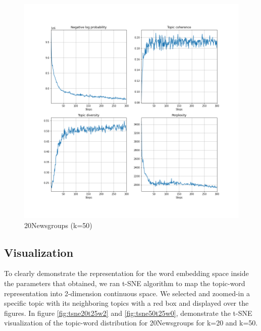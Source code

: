 \begin{figure}
\centering
\includegraphics[width=1\linewidth]{figures/0106/ppl_50t}
\caption{20Newsgroups (k=50)}
\label{fig:ppl50t}
\end{figure}
\subsection{Visualization}
To clearly demonstrate the representation for the word embedding space inside the parameters that obtained, we ran t-SNE algorithm to map the topic-word representation into 2-dimension continuous space. We selected and zoomed-in a specific topic with its neighboring topics with a red box and displayed over the figures. In figure \ref{fig:tsne20t25w2} and \ref{fig:tsne50t25w0}, demonstrate the t-SNE visualization of the topic-word distribution for 20Newsgroups for k=20 and k=50. 

